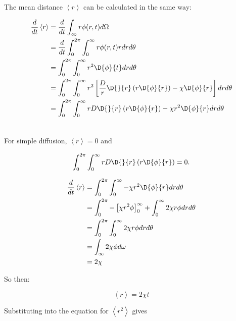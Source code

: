 The mean distance $ \left<r\right>$ can be calculated in the same way:

\begin{equation}
\begin{split}
\frac{d}{dt} \left<r\right> &= \frac{d}{dt}\int_{\infty}r \phi(r,t) d\Omega \\
                              &= \frac{d}{dt} \int_0^{2\pi}\int_0^{\infty} r \phi(r,t)r dr d\theta \\
                              &= \int_0^{2\pi} \int_0^{\infty} r^2 \D{\phi}{t} dr d\theta \\
                              &= \int_0^{2\pi} \int_0^{\infty} r^2 \left[ \frac{D}{r} \D{}{r}\left(r \D{\phi}{r}\right)-\chi\D{\phi}{r} \right] dr d\theta \\
                              &= \int_0^{2\pi} \int_0^{\infty} rD  \D{}{r}\left(r \D{\phi}{r}\right) -  \chi r^2 \D{\phi}{r} dr d\theta \\
\nonumber
\end{split}
\end{equation}


For simple diffusion, $\left<r\right> = 0$ and


\begin{equation}
\int_0^{2\pi} \int_0^{\infty} rD  \D{}{r}\left(r \D{\phi}{r}\right) = 0 .
\end{equation}

\begin{equation}
\begin{split}
\frac{d}{dt} \left<r\right> &= \int_0^{2\pi} \int_0^{\infty} -  \chi r^2 \D{\phi}{r} dr d\theta \\
                            &= \int_0^{2\pi} - \left[ \chi r^2 \phi \right]_0^{\infty} + \int_0^{\infty} 2 \chi r \phi dr d\theta \\
                            &= \int_0^{2\pi} \int_0^{\infty} 2 \chi r \phi dr d\theta \\
                            &= \int_{\infty} 2 \chi \phi d\omega \\
                            &= 2\chi
\nonumber
\end{split}
\end{equation}

So then:

\begin{equation}
\left<r\right> = 2\chi t
\nonumber
\end{equation}

Substituting into the equation for $\left<r^2\right>$ gives

